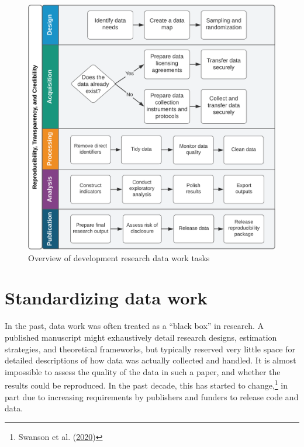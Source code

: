 \documentclass[
]{book}
\begin{document}
\begin{figure}
\includegraphics[width=22.75in]{diagrams/Introduction} \caption{Overview of development research data work tasks}\label{fig:unnamed-chunk-2}
\end{figure}

\hypertarget{standardizing-data-work}{%
\section*{Standardizing data work}\label{standardizing-data-work}}

In the past, data work was often treated as a ``black box'' in research.
A published manuscript might exhaustively detail
research designs, estimation strategies, and theoretical frameworks,
but typically reserved very little space for detailed descriptions
of how data was actually collected and handled.
It is almost impossible to assess the quality of the data in such a paper,
and whether the results could be reproduced.
In the past decade, this has started to change,\footnote{Swanson et al. (\protect\hyperlink{ref-swanson2020research}{2020})}
in part due to increasing requirements by publishers and funders to release code and data.
\end{document}
